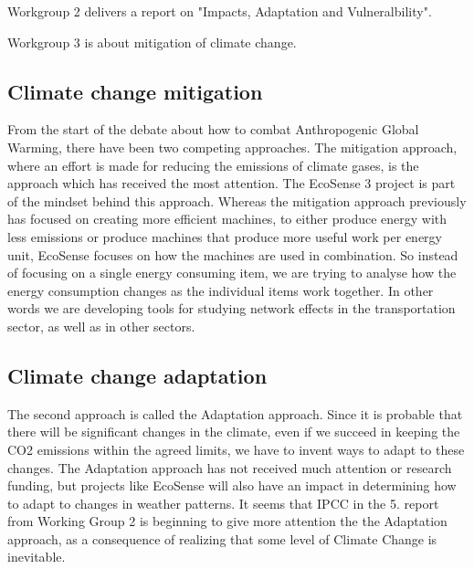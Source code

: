 Workgroup 2 delivers a report on "Impacts, Adaptation and Vulneralbility".

Workgroup 3 is about mitigation of climate change.

\subsection{Climate change mitigation}From the start of the debate about how to combat Anthropogenic Global Warming, there have been two competing approaches. The mitigation approach, where an effort is made for reducing the emissions of climate gases, is the approach which has received the most attention. The EcoSense 3 project is part of the mindset behind this approach. Whereas the mitigation approach previously has focused on creating more efficient machines, to either produce energy with less emissions or produce machines that produce more useful work per energy unit, EcoSense focuses on how the machines are used in combination. So instead of focusing on a single energy consuming item, we are trying to analyse how the energy consumption changes as the individual items work together. In other words we are developing tools for studying network effects in the transportation sector, as well as in other sectors.


\subsection{Climate change adaptation}
The second approach is called the Adaptation approach. Since it is probable that there will be significant changes in the climate, even if we succeed in keeping the CO2 emissions within the agreed limits, we have to invent ways to adapt to these changes. The Adaptation approach has not received much attention or research funding, but projects like EcoSense will also have an impact in determining how to adapt to changes in weather patterns. It seems that IPCC in the 5. report from Working Group 2 is beginning to give more attention the the Adaptation approach, as a consequence of realizing that some level of Climate Change is inevitable.

